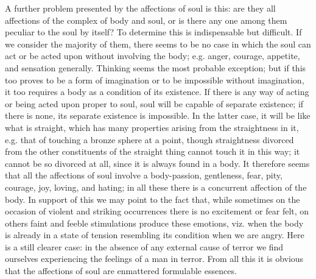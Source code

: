 A further problem presented by the affections of soul is this: are
they all affections of the complex of body and soul, or is there any
one among them peculiar to the soul by itself? To determine this is
indispensable but difficult. If we consider the majority of them,
there seems to be no case in which the soul can act or be acted upon
without involving the body; e.g. anger, courage, appetite, and sensation
generally. Thinking seems the most probable exception; but if this
too proves to be a form of imagination or to be impossible without
imagination, it too requires a body as a condition of its existence.
If there is any way of acting or being acted upon proper to soul,
soul will be capable of separate existence; if there is none, its
separate existence is impossible. In the latter case, it will be like
what is straight, which has many properties arising from the straightness
in it, e.g. that of touching a bronze sphere at a point, though straightness
divorced from the other constituents of the straight thing cannot
touch it in this way; it cannot be so divorced at all, since it is
always found in a body. It therefore seems that all the affections
of soul involve a body-passion, gentleness, fear, pity, courage, joy,
loving, and hating; in all these there is a concurrent affection of
the body. In support of this we may point to the fact that, while
sometimes on the occasion of violent and striking occurrences there
is no excitement or fear felt, on others faint and feeble stimulations
produce these emotions, viz. when the body is already in a state of
tension resembling its condition when we are angry. Here is a still
clearer case: in the absence of any external cause of terror we find
ourselves experiencing the feelings of a man in terror. From all this
it is obvious that the affections of soul are enmattered formulable
essences. 

